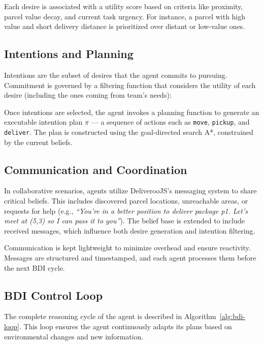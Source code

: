 \documentclass[conference]{IEEEtran}
\begin{document}
Each desire is associated with a utility score based on criteria like proximity, parcel value decay, and current task urgency. For instance, a parcel with high value and short delivery distance is prioritized over distant or low-value ones.

\subsection{Intentions and Planning}

Intentions are the subset of desires that the agent commits to pursuing. Commitment is governed by a filtering function that considers the utility of each desire (including the ones coming from team's needs):

Once intentions are selected, the agent invokes a planning function to generate an executable intention plan $\pi$ — a sequence of actions such as \texttt{move}, \texttt{pickup}, and \texttt{deliver}. The plan is constructed using the goal-directed search A*, constrained by the current beliefs.

\subsection{Communication and Coordination}

In collaborative scenarios, agents utilize DeliverooJS’s messaging system to share critical beliefs. This includes discovered parcel locations, unreachable areas, or requests for help (e.g., \textit{``You're in a better position to deliver package p1. Let's meet at (5,3) so I can pass it to you''}). The belief base is extended to include received messages, which influence both desire generation and intention filtering.

Communication is kept lightweight to minimize overhead and ensure reactivity. Messages are structured and timestamped, and each agent processes them before the next BDI cycle.

\subsection{BDI Control Loop}

The complete reasoning cycle of the agent is described in Algorithm~\ref{alg:bdi-loop}. This loop ensures the agent continuously adapts its plans based on environmental changes and new information.
\end{document}
